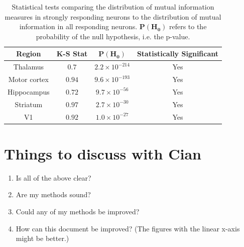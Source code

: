 \documentclass[a4paper,12pt]{article}
\theoremstyle{definition}
\begin{document}
\begin{table}[ht!]
  \begin{center}
    \caption{Statistical tests comparing the distribution of mutual information measures in strongly responding neurons to the distribution of mutual information in all responding neurons. $\mathbf{P(H_0)}$ refers to the probability of the null hypothesis, i.e. the p-value.}
    \label{tab:strong_info_ks_test}
    \begin{tabular}{c|c|c|c} %
      \textbf{Region} & \textbf{K-S Stat} & $\mathbf{P(H_0)}$ & \textbf{Statistically Significant}\\
      \hline
      Thalamus      & $0.7$   & $2.2 \times 10^{-214}$  & Yes \\
      Motor cortex  & $0.94$  & $9.6 \times 10^{-193}$  & Yes \\
      Hippocampus   & $0.72$  & $9.7 \times 10^{-56}$   & Yes \\
      Striatum      & $0.97$  & $2.7 \times 10^{-30}$   & Yes \\
      V1            & $0.92$  & $1.0 \times 10^{-27}$   & Yes \\
    \end{tabular}
  \end{center}
\end{table}

\section*{Things to discuss with Cian}
\begin{enumerate}
  \item Is all of the above clear?
  \item Are my methods sound?
  \item Could any of my methods be improved?
  \item How can this document be improved? (The figures with the linear x-axis might be better.)
\end{enumerate}


\newpage


\end{document}
